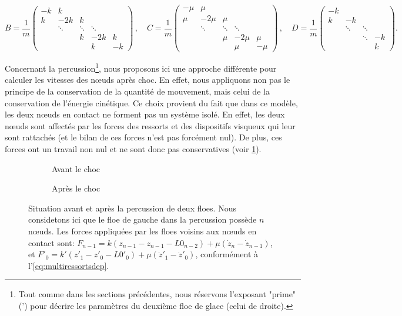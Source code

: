 $$
B = \frac{1}{m} \begin{pmatrix}
    -k & k &  &  &  \\
    k & -2k & k &  &  \\
     & \ddots & \ddots & \ddots &  \\
     &  & k & -2k & k \\
     &  &  & k & -k
    \end{pmatrix} \, , \quad 
C = \frac{1}{m} \begin{pmatrix}
    -\mu & \mu &  &  &  \\
    \mu & -2\mu & \mu &  &  \\
     & \ddots & \ddots & \ddots &  \\
     &  & \mu & -2\mu & \mu \\
     &  &  & \mu & -\mu
    \end{pmatrix} \,, \quad 
D = \frac{1}{m} \begin{pmatrix}
    -k &  &  &  \\
    k & -k &  &  \\
     & \ddots & \ddots &  \\
     &  & \ddots & -k \\
     &  &  & k 
    \end{pmatrix}.
$$

Concernant la percussion\footnote{Tout comme dans les sections précédentes, nous réservons l'exposant "prime" (') pour décrire les paramètres du deuxième floe de glace (celui de droite).}, nous proposons ici une approche différente pour calculer les vitesses des n\oe{}uds après choc. En effet, nous appliquons non pas le principe de la conservation de la quantité de mouvement, mais celui de la conservation de l'énergie cinétique. Ce choix provient du fait que dans ce modèle, les deux n\oe{}uds en contact ne forment pas un système isolé. En effet, les deux n\oe{}uds sont affectés par les forces des ressorts et des dispositifs visqueux qui leur sont rattachés (et le bilan de ces forces n'est pas forcément nul). De plus, ces forces ont un travail non nul et ne sont donc pas conservatives (voir \cref{fig:situationcontact4}). 
\begin{figure}[!h]
    \begin{subfigure}[b]{0.48\textwidth}
        \centering
        \caption{Avant le choc}
    \end{subfigure}
    \begin{subfigure}[b]{0.48\textwidth}
        \centering
        \caption{Après le choc}
    \end{subfigure}
       \caption{Situation avant et après la percussion de deux floes. Nous considetons ici que le floe de gauche dans la percussion possède $n$ n\oe{}uds. Les forces appliquées par les floes voisins aux n\oe{}uds en contact sont: $F_{n-1} = k(z_{n-1} - z_{n-1} - L0_{n-2}) + \mu (\dot z_{n} - \dot z_{n-1})$, et $F'_0 = k'(z'_1 - z'_0 - L0'_0) + \mu (\dot z'_1 - \dot z'_0)$, conformément à l'\cref{eq:multiressortsdep}.}
       \label{fig:situationcontact4}
\end{figure}

